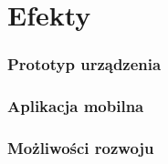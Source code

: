 \part{Efekty}

\section{Prototyp urządzenia}

\section{Aplikacja mobilna}

\section{Możliwości rozwoju}